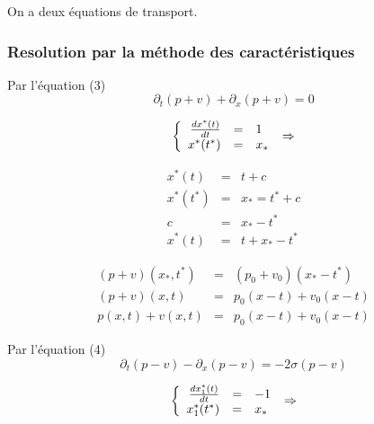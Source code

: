 \documentclass[a4paper,11pt]{article}
\begin{document}
On a deux équations de transport.

\subsubsection*{Resolution par la méthode des caractéristiques}
Par l'équation (3) 
\begin{equation*}
\partial_{t}(p+v) + \partial_{x}(p+v) = 0 
\end{equation*}

\begin{equation*}
\left\{
\begin{array}{rcl}
    \frac{dx^{*}(t)}{dt} &=& 1 \\
    x^{*}(t^{*}) &=& x_{*}
\end{array}
\right. \\
\Rightarrow
\end{equation*}

\begin{equation*}
\begin{array}{rcl}
x^{*}(t) &=& t +c \\
x^{*}(t^{*}) &=& x_{*} = t^{*}+c \\
c &=& x_{*}-t^{*} \\
x^{*}(t) &=& t + x_{*}-t^{*}
\end{array}
\end{equation*}

\begin{equation*}
\begin{array}{rcl}
    (p+v)(x_{*},t^{*}) &=& (p_{0}+v_{0})(x_{*}-t^{*}) \\
    (p+v)(x,t) &=& p_{0}(x-t) + v_{0}(x-t) \\
    p(x,t) + v(x,t) &=& p_{0}(x-t) + v_{0}(x-t)
\end{array}
\end{equation*}

Par l'équation (4)
\begin{equation*}
\partial_{t}(p-v) - \partial_{x}(p-v) = -2\sigma(p-v)
\end{equation*}

\begin{equation*}
\left\{
\begin{array}{rcl}
    \frac{dx_{1}^{*}(t)}{dt} &=& -1 \\
    x_{1}^{*}(t^{*}) &=& x_{*}
\end{array}
\right. \\
\Rightarrow
\end{equation*}
\end{document}

